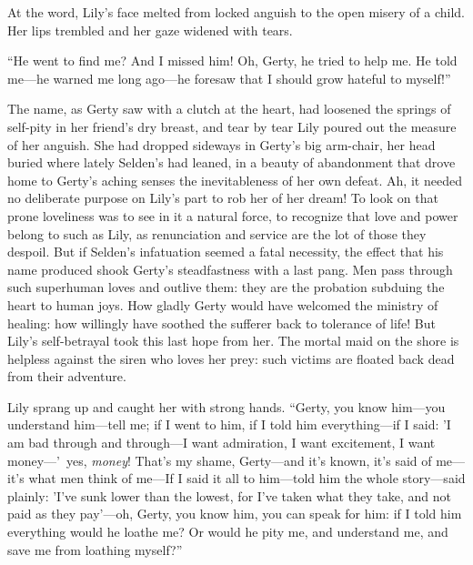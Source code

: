 \documentclass[12pt,a4paper]{book}
\begin{document}
At the word, Lily's face melted from locked anguish to the open
misery of a child. Her lips trembled and her gaze widened with
tears.





``He went to find me? And I missed him! Oh, Gerty, he
tried to help me. He told me---he warned me long ago---he foresaw
that I should grow hateful to myself!''





The name, as Gerty saw with a clutch at the heart, had loosened
the springs of self-pity in her friend's dry breast, and tear by
tear Lily poured out the measure of her anguish. She had dropped
sideways in Gerty's big arm-chair, her head buried where lately
Selden's had leaned, in a beauty of abandonment that drove home
to Gerty's aching senses the inevitableness of her own defeat. 
Ah, it needed no deliberate purpose on Lily's part to rob her of
her dream! To look on that prone loveliness was to see in it a
natural force, to recognize that love and power belong to such as
Lily, as renunciation and service are the lot of those they
despoil. But if Selden's infatuation seemed a fatal necessity,
the effect that his name produced shook Gerty's steadfastness
with a last pang. Men pass through such superhuman loves and
outlive them: they are the probation subduing the heart to human
joys. How gladly Gerty would have welcomed the ministry of
healing: how willingly have soothed the sufferer back to
tolerance of life! But Lily's self-betrayal took this last hope
from her. The mortal maid on the shore is helpless against the
siren who loves her prey: such victims are floated back dead
from their adventure.





Lily sprang up and caught her with strong hands. ``Gerty, you know
him---you understand him---tell me; if I went to him, if I told
him everything---if I said: 'I am bad through and through---I want
admiration, I want excitement, I want money---'\ yes, \textit{money}! 
That's my shame, Gerty---and it's known, it's said of me---it's
what men think of me---If I said it all to him---told him the
whole story---said plainly: 'I've sunk lower than the lowest, for
I've taken what they take, and not paid as they pay'---oh, Gerty,
you know him, you can speak for him: if I told him everything
would he loathe me? Or would he pity me, and understand me, and
save me from loathing myself?''
\end{document}
